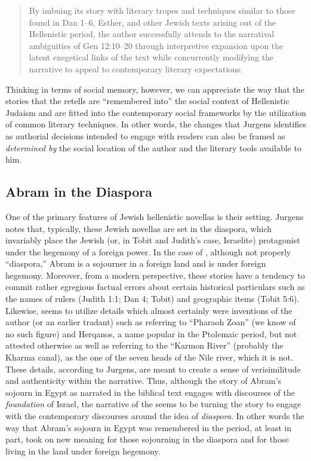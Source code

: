 \begin{quote}
By imbuing its story with literary tropes and techniques similar to those found in Dan 1--6, Esther, and other Jewish texts arising out of the Hellenistic period, the author successfully attends to the narratival ambiguities of Gen 12:10--20 through interpretive expansion upon the latent exegetical links of the text while concurrently modifying the narrative to appeal to contemporary literary expectations.\autocite[27]{jurgens_jsj2018} \end{quote}

Thinking in terms of social memory, however, we can appreciate the way that the stories that the \ga retells are ``remembered into'' the social context of Hellenistic Judaism and are fitted into the contemporary social frameworks by the utilization of common literary techniques. In other words, the changes that Jurgens identifies as authorial decisions intended to engage with readers can also be framed as \emph{determined by} the social location of the author and the literary tools available to him.


\subsection{Abram in the Diaspora}

One of the primary features of Jewish hellenistic novellas is their setting. Jurgens notes that, typically, these Jewish novellas are set in the diaspora, which invariably place the Jewish (or, in Tobit and Judith's case, Israelite) protagonist under the hegemony of a foreign power. In the case of \ga, although not properly ``diaspora,'' Abram is a sojourner in a foreign land and is under foreign hegemony. Moreover, from a modern perspective, these stories have a tendency to commit rather egregious factual errors about certain historical particulars such as the names of rulers (Judith 1:1; Dan 4; Tobit) and geographic items (Tobit 5:6). Likewise, \ga seems to utilize details which almost certainly were inventions of the author (or an earlier tradant) such as referring to ``Pharaoh Zoan'' (we know of no such figure) and Herqanos, a name popular in the Ptolemaic period, but not attested otherwise as well as referring to the ``Karmon River'' (probably the Kharma canal), as the one of the seven heads of the Nile river, which it is not.\autocites[7]{jurgens_jsj2018}[See also][50--59]{machiela_as2010}[197--199]{fitzmyer2004} These details, according to Jurgens, are meant to create a sense of verisimilitude and authenticity within the narrative. Thus, although the story of Abram's sojourn in Egypt as narrated in the biblical text engages with discourses of the \emph{foundation} of Israel, the narrative of the \ga seems to be turning the story to engage with the contemporary discourses around the idea of \emph{diaspora}. In other words the way that Abram's sojourn in Egypt was remembered in the \secondtemple period, at least in part, took on new meaning for those sojourning in the diaspora and for those living in the land under foreign hegemony.

